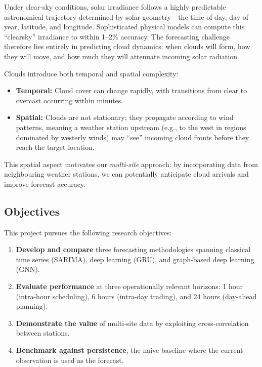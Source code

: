 \documentclass[11pt,a4paper]{article}
\begin{document}
Under clear-sky conditions, solar irradiance follows a highly predictable astronomical trajectory determined by solar geometry---the time of day, day of year, latitude, and longitude. Sophisticated physical models can compute this ``clearsky'' irradiance to within 1--2\% accuracy. The forecasting challenge therefore lies entirely in predicting cloud dynamics: when clouds will form, how they will move, and how much they will attenuate incoming solar radiation.

Clouds introduce both temporal and spatial complexity:
\begin{itemize}[noitemsep]
    \item \textbf{Temporal:} Cloud cover can change rapidly, with transitions from clear to overcast occurring within minutes.
    \item \textbf{Spatial:} Clouds are not stationary; they propagate according to wind patterns, meaning a weather station upstream (e.g., to the west in regions dominated by westerly winds) may ``see'' incoming cloud fronts before they reach the target location.
\end{itemize}

This spatial aspect motivates our \textit{multi-site} approach: by incorporating data from neighbouring weather stations, we can potentially anticipate cloud arrivals and improve forecast accuracy.

\subsection{Objectives}

This project pursues the following research objectives:

\begin{enumerate}[noitemsep]
    \item \textbf{Develop and compare} three forecasting methodologies spanning classical time series (SARIMA), deep learning (GRU), and graph-based deep learning (GNN).
    \item \textbf{Evaluate performance} at three operationally relevant horizons: 1 hour (intra-hour scheduling), 6 hours (intra-day trading), and 24 hours (day-ahead planning).
    \item \textbf{Demonstrate the value} of multi-site data by exploiting cross-correlation between stations.
    \item \textbf{Benchmark against persistence}, the naive baseline where the current observation is used as the forecast.
\end{enumerate}
\end{document}
